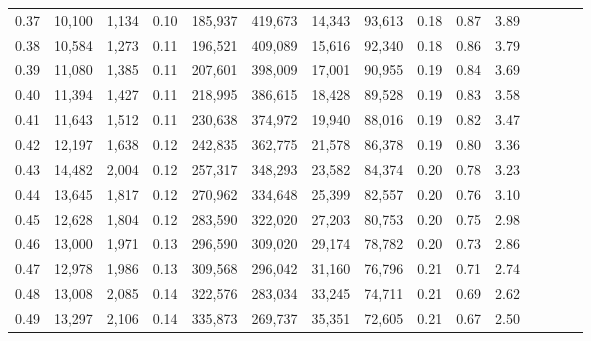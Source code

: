 \begin{tabular}{rrrcrrrrrrrrrrr}
0.37 &  10,100 &  1,134 &                                       0.10 &  185,937 &  419,673 &   14,343 &   93,613 &  0.18 &  0.87 &                         3.89 \\
0.38 &  10,584 &  1,273 &                                       0.11 &  196,521 &  409,089 &   15,616 &   92,340 &  0.18 &  0.86 &                         3.79 \\
0.39 &  11,080 &  1,385 &                                       0.11 &  207,601 &  398,009 &   17,001 &   90,955 &  0.19 &  0.84 &                         3.69 \\
0.40 &  11,394 &  1,427 &                                       0.11 &  218,995 &  386,615 &   18,428 &   89,528 &  0.19 &  0.83 &                         3.58 \\
0.41 &  11,643 &  1,512 &                                       0.11 &  230,638 &  374,972 &   19,940 &   88,016 &  0.19 &  0.82 &                         3.47 \\
0.42 &  12,197 &  1,638 &                                       0.12 &  242,835 &  362,775 &   21,578 &   86,378 &  0.19 &  0.80 &                         3.36 \\
0.43 &  14,482 &  2,004 &                                       0.12 &  257,317 &  348,293 &   23,582 &   84,374 &  0.20 &  0.78 &                         3.23 \\
0.44 &  13,645 &  1,817 &                                       0.12 &  270,962 &  334,648 &   25,399 &   82,557 &  0.20 &  0.76 &                         3.10 \\
0.45 &  12,628 &  1,804 &                                       0.12 &  283,590 &  322,020 &   27,203 &   80,753 &  0.20 &  0.75 &                         2.98 \\
0.46 &  13,000 &  1,971 &                                       0.13 &  296,590 &  309,020 &   29,174 &   78,782 &  0.20 &  0.73 &                         2.86 \\
0.47 &  12,978 &  1,986 &                                       0.13 &  309,568 &  296,042 &   31,160 &   76,796 &  0.21 &  0.71 &                         2.74 \\
0.48 &  13,008 &  2,085 &                                       0.14 &  322,576 &  283,034 &   33,245 &   74,711 &  0.21 &  0.69 &                         2.62 \\
0.49 &  13,297 &  2,106 &                                       0.14 &  335,873 &  269,737 &   35,351 &   72,605 &  0.21 &  0.67 &                         2.50 \\

\end{tabular}
